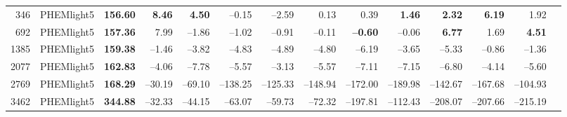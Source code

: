 \begin{table}[htb]
{\begin{tabular}{r l *{12}{r}}
      346  & PHEMlight5 & \textbf{156.60}      & \textbf{8.46}   & \textbf{4.50}   & –0.15  & –2.59  & 0.13    & 0.39    & \textbf{1.46}   & \textbf{2.32}   & \textbf{6.19}   & 1.92   \\
      692  & PHEMlight5 & \textbf{157.36}      & 7.99   & –1.86  & –1.02  & –0.91  & –0.11   & \textbf{ –0.60} & –0.06  & \textbf{6.77}   & 1.69   & \textbf{4.51}  \\
      1385 & PHEMlight5 & \textbf{159.38}      & –1.46  & –3.82  & –4.83  & –4.89  & –4.80   & –6.19   & –3.65  & –5.33  & –0.86  & –1.36  \\
      2077 & PHEMlight5 & \textbf{162.83}      & –4.06  & –7.78  & –5.57  & –3.13  & –5.57   & –7.11   & –7.15  & –6.80  & –4.14  & –5.60  \\
      2769 & PHEMlight5 & \textbf{168.29}      & –30.19 & –69.10 & –138.25 & –125.33 & –148.94 & –172.00  & –189.98 & –142.67 & –167.68 & –104.93 \\
      3462 & PHEMlight5 & \textbf{344.88}      & –32.33 & –44.15 & –63.07  & –59.73  & –72.32  & –197.81  & –112.43 & –208.07 & –207.66 & –215.19 \\
      \bottomrule
    \end{tabular}%
  }
\end{table}

